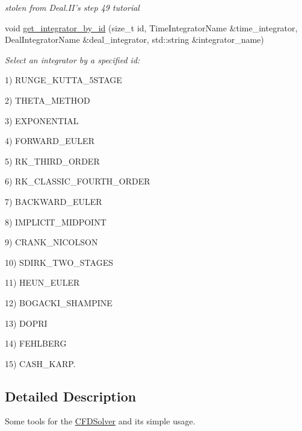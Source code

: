 \begin{DoxyCompactItemize}
\begin{DoxyCompactList}\small\item\em stolen from Deal.II's step 49 tutorial \item\end{DoxyCompactList}\item 
void \hyperlink{namespacenatrium_1_1CFDSolverUtilities_a3719826384e1c13644bac00524f72a46}{get\_\-integrator\_\-by\_\-id} (size\_\-t id, TimeIntegratorName \&time\_\-integrator, DealIntegratorName \&deal\_\-integrator, std::string \&integrator\_\-name)
\begin{DoxyCompactList}\small\item\em Select an integrator by a specified id:
\begin{DoxyItemize}
\item 1) RUNGE\_\-KUTTA\_\-5STAGE
\item 2) THETA\_\-METHOD
\item 3) EXPONENTIAL
\item 4) FORWARD\_\-EULER
\item 5) RK\_\-THIRD\_\-ORDER
\item 6) RK\_\-CLASSIC\_\-FOURTH\_\-ORDER
\item 7) BACKWARD\_\-EULER
\item 8) IMPLICIT\_\-MIDPOINT
\item 9) CRANK\_\-NICOLSON
\item 10) SDIRK\_\-TWO\_\-STAGES
\item 11) HEUN\_\-EULER
\item 12) BOGACKI\_\-SHAMPINE
\item 13) DOPRI
\item 14) FEHLBERG
\item 15) CASH\_\-KARP. 
\end{DoxyItemize}\item\end{DoxyCompactList}\end{DoxyCompactItemize}


\subsection{Detailed Description}
Some tools for the \hyperlink{classnatrium_1_1CFDSolver}{CFDSolver} and its simple usage. 

